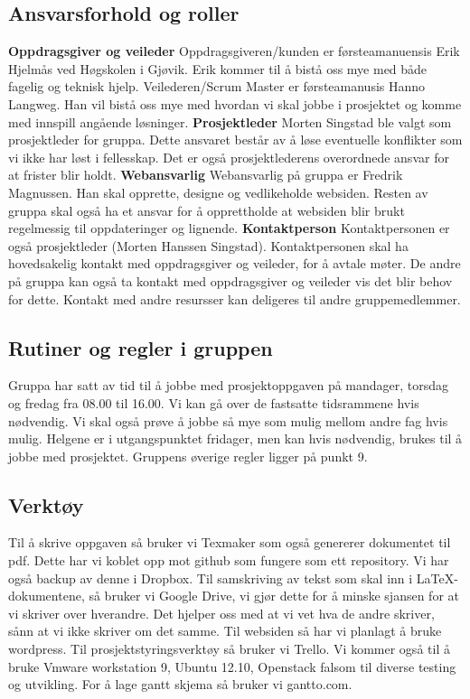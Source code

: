 \documentclass[12pt,a4paper]{article}
\begin{document}
\subsection{Ansvarsforhold og roller}
\textbf{Oppdragsgiver og veileder}
Oppdragsgiveren/kunden er førsteamanuensis Erik Hjelmås ved Høgskolen i Gjøvik. Erik kommer til å bistå oss mye med både fagelig og teknisk hjelp. Veilederen/Scrum Master er førsteamanusis Hanno Langweg. Han vil bistå oss mye med hvordan vi skal jobbe i prosjektet og komme med innspill angående løsninger. \newline
\textbf{Prosjektleder}
Morten Singstad ble valgt som prosjektleder for gruppa. Dette ansvaret består av å løse eventuelle konflikter som vi ikke har løst i fellesskap. Det er også prosjektlederens overordnede ansvar for at frister blir holdt. \newline
\textbf{Webansvarlig}
Webansvarlig på gruppa er Fredrik Magnussen. Han skal opprette, designe og vedlikeholde websiden. Resten av gruppa skal også ha et ansvar for å opprettholde at websiden blir brukt regelmessig til oppdateringer og lignende. \newline
\textbf{Kontaktperson}
Kontaktpersonen er også prosjektleder (Morten Hanssen Singstad). Kontaktpersonen skal ha hovedsakelig kontakt med oppdragsgiver og veileder, for å avtale møter. De andre på gruppa kan også ta kontakt med oppdragsgiver og veileder vis det blir behov for dette. Kontakt med andre resursser kan deligeres til andre gruppemedlemmer.

\subsection{Rutiner og regler i gruppen}
Gruppa har satt av tid til å jobbe med prosjektoppgaven på mandager, torsdag og fredag fra 08.00 til 16.00. Vi kan gå over de fastsatte tidsrammene hvis nødvendig. Vi skal også prøve å jobbe så mye som mulig mellom andre fag hvis mulig. Helgene er i utgangspunktet fridager, men kan hvis nødvendig, brukes til å jobbe med prosjektet. Gruppens øverige regler ligger på punkt 9.

\subsection{Verktøy}
Til å skrive oppgaven så bruker vi Texmaker som også genererer dokumentet til pdf. Dette har vi koblet opp mot github som fungere som ett repository. Vi har også backup av denne i Dropbox. Til samskriving av tekst som skal inn i  LaTeX-dokumentene, så bruker vi Google Drive, vi gjør dette for å minske sjansen for at vi skriver over hverandre. Det hjelper oss med at vi vet hva de andre skriver, sånn at vi ikke skriver om det samme. Til websiden så har vi planlagt å bruke wordpress. Til prosjektstyringsverktøy så bruker vi Trello. Vi kommer også til å bruke Vmware workstation 9, Ubuntu 12.10, Openstack falsom til diverse testing og utvikling. For å lage gantt skjema så bruker vi gantto.com.
\end{document}
